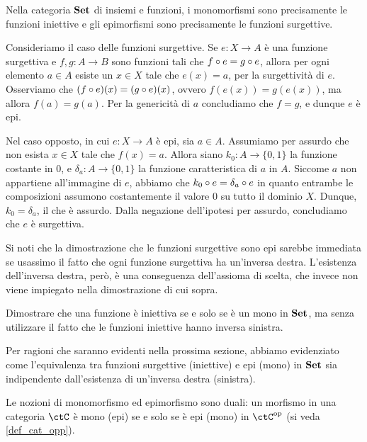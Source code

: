 \begin{example}\label{monoepi_in_set}
	Nella categoria \(\mathbf{Set}\) di insiemi e funzioni, i monomorfismi sono precisamente le funzioni iniettive
	e gli epimorfismi sono precisamente le funzioni surgettive.

	Consideriamo il caso delle funzioni surgettive.
	Se \(e \colon X \to A\) è una funzione surgettiva e \(f, g \colon A \to B\) sono funzioni tali che \(f \circ e = g \circ e\),
	allora per ogni elemento \(a \in A\) esiste un \(x \in X\) tale che \(e(x) = a\), per la surgettività di \(e\).
	Osserviamo che \((f \circ e)(x) = (g \circ e)(x)\), ovvero \(f(e(x)) = g(e(x))\),
	ma allora \(f(a) = g(a)\).
	Per la genericità di \(a\) concludiamo che \(f = g\), e dunque \(e\) è epi.

	Nel caso opposto, in cui \(e \colon X \to A\) è epi, sia \(a \in A\).
	Assumiamo per assurdo che non esista \(x \in X\) tale che \(f(x) = a\).
	Allora siano \(k_0 \colon A \to \{0, 1\}\) la funzione costante in \(0\),
	e \(\delta_a \colon A \to \{0, 1\}\) la funzione caratteristica di \(a\) in \(A\).
	Siccome \(a\) non appartiene all'immagine di \(e\), abbiamo che \(k_0 \circ e = \delta_a \circ e\)
	in quanto entrambe le composizioni assumono costantemente il valore \(0\) su tutto il dominio \(X\).
	Dunque, \(k_0 = \delta_a\), il che è assurdo.
	Dalla negazione dell'ipotesi per assurdo, concludiamo che \(e\) è surgettiva.
\end{example}

Si noti che la dimostrazione che le funzioni surgettive sono epi sarebbe immediata
se usassimo il fatto che ogni funzione surgettiva ha un'inversa destra.
L'esistenza dell'inversa destra, però, è una conseguenza dell'assioma di scelta,
che invece non viene impiegato nella dimostrazione di cui sopra.

\begin{exercise}
	Dimostrare che una funzione è iniettiva se e solo se è un mono in \(\mathbf{Set}\),
	ma senza utilizzare il fatto che le funzioni iniettive hanno inversa sinistra.
\end{exercise}

Per ragioni che saranno evidenti nella prossima sezione,
abbiamo evidenziato come l'equivalenza tra funzioni surgettive (iniettive)
e epi (mono) in \(\mathbf{Set}\) sia indipendente dall'esistenza di un'inversa destra (sinistra).

\begin{remark}
	\label{rmk:mono-epi-duality}
	Le nozioni di monomorfismo ed epimorfismo sono duali:
	un morfismo in una categoria \(\ctC\) è mono (epi) se e solo se è epi (mono) in \(\ctC^{\op}\) (si veda \ref{def_cat_opp}).
\end{remark}

